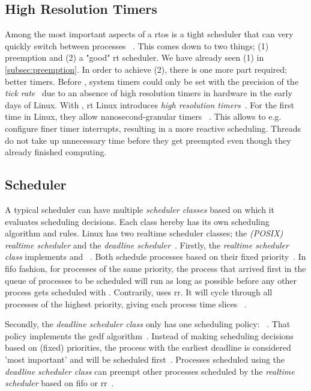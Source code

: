 \documentclass[10pt,twocolumn,a4paper]{article}
\begin{document}
\subsection{High Resolution Timers}\label{subsec:hr-timers}
Among the most important aspects of a \acrshort{rtos} is a tight scheduler that can very quickly switch between processes ~\cite{reghenzani_realtime_2019}.
This comes down to two things; (1) preemption and (2) a "good" \acrshort{rt} scheduler.
We have already seen (1) in \autoref{subsec:preemption}.
In order to achieve (2), there is one more part required; better timers.
Before , system timers could only be set with the precision of the \emph{tick rate}~\cite{reghenzani_realtime_2019} due to an absence of high resolution timers in hardware in the early days of Linux.
With , \acrshort{rt} Linux introduces \emph{high resolution timers}~\cite{lf:timers}.
For the first time in Linux, they allow nanosecond-granular timers ~\cite{reghenzani_realtime_2019}.
This allows to e.g. configure finer timer interrupts, resulting in a more reactive scheduling.
Threads do not take up unnecessary time before they get preempted even though they already finished computing.

\subsection{Scheduler}\label{subsec:scheduler}
A typical scheduler can have multiple \emph{scheduler classes} based on which it evaluates scheduling decisions.
Each class hereby has its own scheduling algorithm and rules.
Linux has two realtime scheduler classes; the \emph{(POSIX) realtime scheduler} and the \emph{deadline scheduler}~\cite{bristot_de_oliveira_deadline_2018}.
Firstly, the \emph{realtime scheduler class} implements  and ~\cite{lf:scheduler}.
Both schedule processes based on their fixed priority~\cite{lf:scheduler,de_oliveira_timing_2016}.
In \acrfull{fifo} fashion, for processes of the same priority, the process that arrived first in the queue of processes to be scheduled will run as long as possible before any other process gets scheduled with .
Contrarily,  uses \acrfull{rr}.
It will cycle through all processes of the highest priority, giving each process time slices ~\cite{bristot_de_oliveira_deadline_2018}.

Secondly, the \emph{deadline scheduler class} only has one scheduling policy: ~\cite{bristot_de_oliveira_deadline_2018}.
That policy implements the \acrfull{gedf} algorithm~\cite{lelli_deadline_2016}.
Instead of making scheduling decisions based on (fixed) priorities, the process with the earliest deadline is considered 'most important' and will be scheduled first~\cite{bristot_de_oliveira_deadline_2018}.
Processes scheduled using the \emph{deadline scheduler class} can preempt other processes scheduled by the \emph{realtime scheduler} based on \acrshort{fifo} or \acrshort{rr}~\cite{lf:scheduler}.
\end{document}
